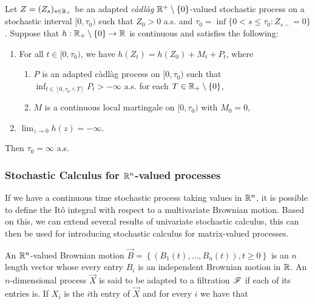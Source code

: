 \begin{lemma} \label{lemma:mckean}
    Let $Z = (Z_s)_{s\in \mathbb R_+}$ be an adapted \textit{càdlàg} $\mathbb R^+\setminus \{0\}$-valued stochastic process on a stochastic interval $[0,\tau_0)$ such that $Z_0 > 0$ a.s. and $\tau_0 = \inf\{0 < s \le \tau_0 : Z_{s-} = 0\}$. Suppose that $h:\mathbb R_+\setminus\{0\}\to\mathbb R$ is continuous and satisfies the following:

    \begin{enumerate}

        \item For all $t\in[0,\tau_0)$, we have $h(Z_t) = h(Z_0) + M_t + P_t$, where 
        
        \begin{enumerate}
            \item  $P$ is an adapted càdlàg process on $[0,\tau_0)$ such that $\inf_{t\in[0,\tau_0\wedge T]} P_t > - \infty$ a.s. for each $T\in \mathbb R_+\setminus \{0\}$,
            
            \item  $M$ is a continuous local martingale on $[0,\tau_0)$ with $M_0=0$,
        \end{enumerate}
        
        \item $\lim_{z\to 0}h(z) = -\infty$.
    \end{enumerate}

    Then $\tau_0 = \infty$ a.s.
\end{lemma}



\subsubsection{Stochastic Calculus for $\mathbb R^n$-valued processes}

If we have a continuous time stochastic process taking values in $\mathbb R^n$, it is possible to define the Itô integral with respect to a multivariate Brownian motion. Based on this, we can extend several results of univariate stochastic calculus, this can then be used for introducing stochastic calculus for matrix-valued processes.

An $\mathbb R^n$-valued Brownian motion $\vec B = \left\{ (B_1(t), \dots, B_n(t)) , t \ge 0 \right\}$ is an $n$ length vector whose every entry $B_i$ is an independent Brownian motion in $\mathbb R$. An $n$-dimensional process $\vec X$ is said to be adapted to a filtration $\mathscr F$ if each of its entries is. If $X_i$ is the $i$th entry of $\vec X$ and for every $i$ we have that

